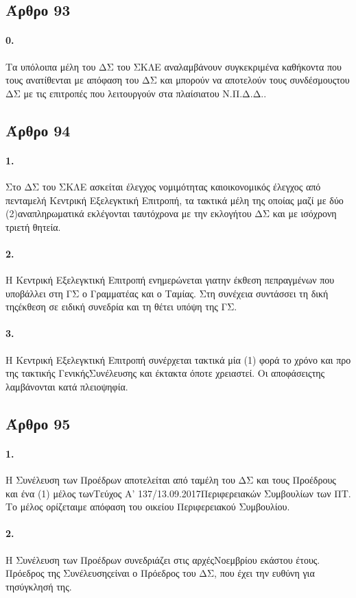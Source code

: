 \documentclass[a4paper,oneside, 10pt]{book}
\begin{document}
\subsection*{ Άρθρο 93 }
\paragraph { 0. } Τα υπόλοιπα μέλη του ΔΣ του ΣΚΛΕ αναλαμβάνουν συγκεκριμένα καθήκοντα που τους ανατίθενται με απόφαση του ΔΣ και μπορούν να αποτελούν τους συνδέσμουςτου ΔΣ με τις επιτροπές που λειτουργούν στα πλαίσιατου Ν.Π.Δ.Δ..
\subsection*{ Άρθρο 94 }
\paragraph { 1. } Στο ΔΣ του ΣΚΛΕ ασκείται έλεγχος νομιμότητας καιοικονομικός έλεγχος από πενταμελή Κεντρική Εξελεγκτική Επιτροπή, τα τακτικά μέλη της οποίας μαζί με δύο (2)αναπληρωματικά εκλέγονται ταυτόχρονα με την εκλογήτου ΔΣ και με ισόχρονη τριετή θητεία.
\paragraph { 2. } Η Κεντρική Εξελεγκτική Επιτροπή ενημερώνεται γιατην έκθεση πεπραγμένων που υποβάλλει στη ΓΣ ο Γραμματέας και ο Ταμίας. Στη συνέχεια συντάσσει τη δική τηςέκθεση σε ειδική συνεδρία και τη θέτει υπόψη της ΓΣ.
\paragraph { 3. } Η Κεντρική Εξελεγκτική Επιτροπή συνέρχεται τακτικά μία (1) φορά το χρόνο και προ της τακτικής ΓενικήςΣυνέλευσης και έκτακτα όποτε χρειαστεί. Οι αποφάσειςτης λαμβάνονται κατά πλειοψηφία.
\subsection*{ Άρθρο 95 }
\paragraph { 1. } Η Συνέλευση των Προέδρων αποτελείται από ταμέλη του ΔΣ και τους Προέδρους και ένα (1) μέλος τωνΤεύχος Α’ 137/13.09.2017Περιφερειακών Συμβουλίων των ΠΤ. Το μέλος ορίζεταιμε απόφαση του οικείου Περιφερειακού Συμβουλίου.
\paragraph { 2. } Η Συνέλευση των Προέδρων συνεδριάζει στις αρχέςΝοεμβρίου εκάστου έτους. Πρόεδρος της Συνέλευσηςείναι ο Πρόεδρος του ΔΣ, που έχει την ευθύνη για τησύγκλησή της.
\end{document}
